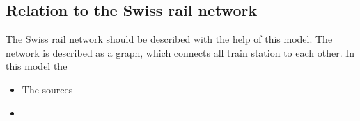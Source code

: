 \subsection{Relation to the Swiss rail network}\label{relationNetwork}
The Swiss rail network should be described with the help of this model. The network is described as a graph, which connects all train station to each other. In this model the 
\begin{itemize}
  \item The sources 
  \item
\end{itemize}
 